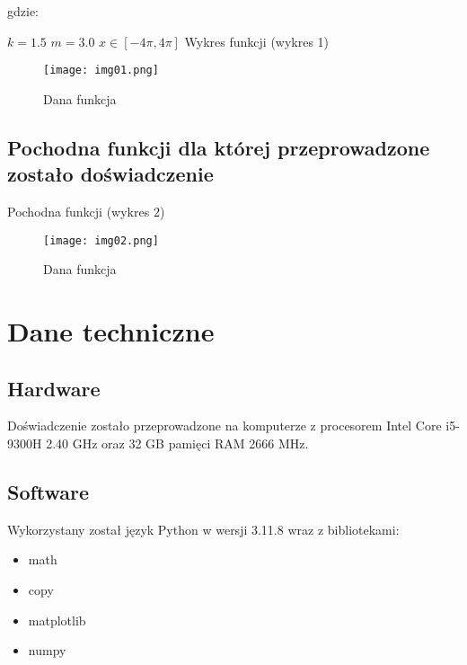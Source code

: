 \documentclass{article}
\begin{document}
\noindent
gdzie:

\bigbreak

\(k = 1.5\)
\newline \indent
\(m = 3.0\)
\newline \indent
\(x \in [-4\pi, 4\pi]\)
\bigbreak
Wykres funkcji (wykres 1)

\begin{figure}[H]
  \centering
  \begin{minipage}[b]{0.3\textwidth}
    \texttt{[image: img01.png]}
    \caption{Dana funkcja}
  \end{minipage}
\end{figure}

\subsection{Pochodna funkcji dla której przeprowadzone zostało doświadczenie }

Pochodna funkcji (wykres 2)

\begin{figure}[H]
  \centering
  \begin{minipage}[b]{0.3\textwidth}
    \texttt{[image: img02.png]}
    \caption{Dana funkcja}
  \end{minipage}
\end{figure}

\section{Dane techniczne}

\subsection{Hardware}

Doświadczenie zostało przeprowadzone na komputerze z procesorem Intel Core i5-9300H 2.40 GHz oraz 32 GB pamięci RAM 2666 MHz.

\subsection{Software}

Wykorzystany został język Python w wersji 3.11.8 wraz z bibliotekami:
\begin{itemize}
\item math
\item copy
\item matplotlib
\item numpy
\end{itemize}
\end{document}
